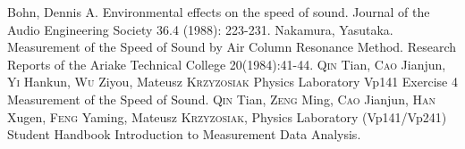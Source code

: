 \begin{thebibliography}{99}
     Bohn, Dennis A. Environmental effects on the speed of sound. Journal of the Audio Engineering Society 36.4 (1988): 223-231.
     Nakamura, Yasutaka. Measurement of the Speed of Sound by Air Column Resonance Method. Research Reports of the Ariake Technical College 20(1984):41-44.
     \textsc{Qin} Tian, \textsc{Cao} Jianjun, \textsc{Yi} Hankun, \textsc{Wu} Ziyou, Mateusz \textsc{Krzyzosiak} Physics Laboratory Vp141 Exercise 4 Measurement of the Speed of Sound.
     \textsc{Qin} Tian, \textsc{Zeng} Ming, \textsc{Cao} Jianjun, \textsc{Han} Xugen, \textsc{Feng} Yaming, Mateusz \textsc{Krzyzosiak}, Physics Laboratory (Vp141/Vp241) Student Handbook Introduction to Measurement Data Analysis.
\end{thebibliography}